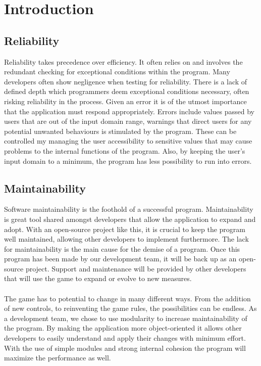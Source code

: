 \documentclass[12pt]{article}
\begin{document}
%
%

\section{Introduction}


\subsection{Reliability}
Reliability takes precedence over efficiency. It often relies on and involves the redundant checking for exceptional conditions within the program. Many developers often show negligence when testing for reliability. There is a lack of defined depth which programmers deem exceptional conditions necessary, often risking reliability in the process. Given an error it is of the utmost importance that the application must respond appropriately. Errors include values passed by users that are out of the input domain range, warnings that direct users for any potential unwanted behaviours is stimulated by the program. These can be controlled my managing the user accessibility to sensitive values that may cause problems to the internal functions of the program.  Also, by keeping the user’s input domain to a minimum, the program has less possibility to run into errors. 

\subsection{Maintainability}
Software maintainability is the foothold of a successful program. Maintainability is great tool shared amongst developers that allow the application to expand and adopt. With an open-source project like this, it is crucial to keep the program well maintained, allowing other developers to implement furthermore. The lack for maintainability is the main cause for the demise of a program. Once this program has been made by our development team, it will be back up as an open-source project. Support and maintenance will be provided by other developers that will use the game to expand or evolve to new measures.\\\\
The game has to potential to change in many different ways. From the addition of new controls, to reinventing the game rules, the possibilities can be endless. As a development team, we chose to use modularity to increase maintainability of the program. By making the application more object-oriented it allows other developers to easily understand and apply their changes with minimum effort. With the use of simple modules and strong internal cohesion the program will maximize the performance as well.
\end{document}
